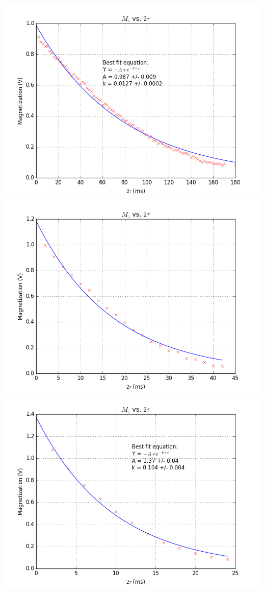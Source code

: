\documentclass{article}
\begin{document}
{\begin{multicols}{2}
\label{fig:27}
\includegraphics[width=\linewidth]{pic-for-report/a0010M-CuSO4-T2-MG.png}
\label{fig:28}
\includegraphics[width=\linewidth]{pic-for-report/a0050M-CuSO4-T2-MG.png}
\label{fig:29}
\includegraphics[width=\linewidth]{pic-for-report/a0100M-CuSO4-T2-MG.png}

\end{multicols}}
\end{document}
